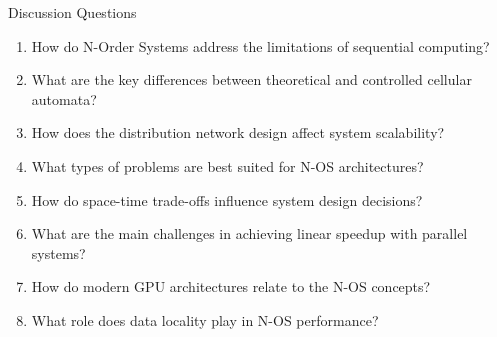 \documentclass[aspectratio=169]{beamer}
\begin{document}
\begin{frame}{Discussion Questions}
\begin{enumerate}
\item How do N-Order Systems address the limitations of sequential computing?
\item What are the key differences between theoretical and controlled cellular automata?
\item How does the distribution network design affect system scalability?
\item What types of problems are best suited for N-OS architectures?
\item How do space-time trade-offs influence system design decisions?
\item What are the main challenges in achieving linear speedup with parallel systems?
\item How do modern GPU architectures relate to the N-OS concepts?
\item What role does data locality play in N-OS performance?
\end{enumerate}
\end{frame}
\end{document}
